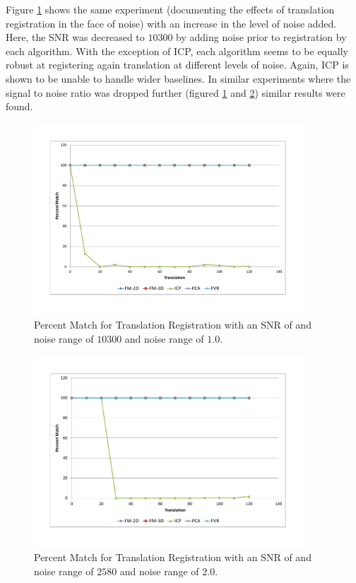 Figure \ref{fig:TNoise1} shows the same experiment (documenting the effects of translation registration in the face of noise) with an increase in the level of noise added. Here, the SNR was decreased to $10300$ by adding noise prior to registration by each algorithm. With the exception of ICP, each algorithm seems to be equally robust at registering again translation at different levels of noise. Again, ICP is shown to be unable to handle wider baselines. In similar experiments where the signal to noise ratio was dropped further (figured \ref{fig:TNoise1} and \ref{fig:TNoise2}) similar results were found. \\


\begin{figure}[!htb]
\centering
\includegraphics[width=4.0in]{images/results/noise/TransNoise1}
\caption{Percent Match for Translation Registration with an SNR of and noise range of $10300$ and noise range of $1.0$.}
\label{fig:TNoise1}
\end{figure}


\begin{figure}[!htb]
\centering
\includegraphics[width=4.0in]{images/results/noise/TransNoise2}
\caption{Percent Match for Translation Registration with an SNR of and noise range of $2580$ and noise range of $2.0$.}
\label{fig:TNoise2}
\end{figure}